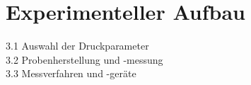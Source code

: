 \chapter{Experimenteller Aufbau}

3.1 Auswahl der Druckparameter\\
3.2 Probenherstellung und -messung\\
3.3 Messverfahren und -geräte\\